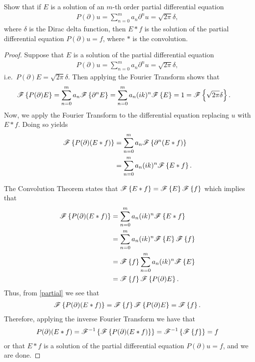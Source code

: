\begin{problem}{9}
  Show that if $E$ is a solution of an $m$-th order partial differential equation
  \begin{align*}
    P(\partial)u = \sum_{n=0}^m a_n \partial^n u = \sqrt{2\pi} \delta,
  \end{align*}
  where $\delta$ is the Dirac delta function, then $E \ast f$ is the solution of
  the partial differential equation $P(\partial)u = f$, where $\ast$ is the convolution.
\end{problem}

\begin{proof}
  Suppose that $E$ is a solution of the partial differential equation
  \begin{align*}
    P(\partial)u = \sum_{n=0}^m a_n \partial^n u = \sqrt{2\pi} \delta,
  \end{align*}
  i.e.\ $P(\partial)E = \sqrt{2\pi}\delta$. Then applying the Fourier Transform
  shows that
  \begin{align}\label{partial}
    \mathscr{F}\left\{ {P(\partial)E} \right\} &= \sum_{n=0}^m a_n \mathscr{F}\left\{ {\partial^n E} \right\}
    = \sum_{n=0}^m a_n (ik)^n \mathscr{F}\left\{ {E} \right\} = 1 = \mathscr{F}\left\{ {\sqrt{2\pi} \delta} \right\}.
  \end{align}
  Now, we apply the Fourier Transform to the differential
  equation replacing $u$ with $E \ast f$. Doing so yields
  \begin{align*}
    \mathscr{F}\left\{ {P(\partial)(E\ast f)} \right\} &= \sum_{n=0}^m a_n \mathscr{F}\left\{ {\partial^n (E\ast f)} \right\} \\
    &=  \sum_{n=0}^m a_n (ik)^n\mathscr{F}\left\{ {E\ast f} \right\}.
  \end{align*}

  The Convolution Theorem states that $\mathscr{F}\left\{ {E \ast f} \right\} = \mathscr{F}\left\{ {E} \right\}\mathscr{F}\left\{ {f} \right\}$ which implies that
  \begin{align*}
    \mathscr{F}\left\{ {P(\partial)(E\ast f)} \right\}
    &=  \sum_{n=0}^m a_n (ik)^n\mathscr{F}\left\{ {E\ast f} \right\} \\
    &=  \sum_{n=0}^m a_n (ik)^n\mathscr{F}\left\{ {E} \right\}\mathscr{F}\left\{ {f} \right\} \\
    &=  \mathscr{F}\left\{ {f} \right\}\sum_{n=0}^m a_n (ik)^n\mathscr{F}\left\{ {E} \right\} \\
    &= \mathscr{F}\left\{ {f} \right\}\mathscr{F}\left\{ {P(\partial)E} \right\}.
  \end{align*}
  Thus, from \eqref{partial} we see that
  \begin{align*}
    \mathscr{F}\left\{ {P(\partial)(E\ast f)} \right\} =  \mathscr{F}\left\{ {f} \right\}\mathscr{F}\left\{ {P(\partial)E} \right\} = \mathscr{F}\left\{ {f} \right\}.
  \end{align*}
  Therefore, applying the inverse Fourier Transform we have that
  \begin{align*}
    P(\partial)(E\ast f) = \mathscr{F}^{-1}\left\{ {\mathscr{F}\left\{ {P(\partial)(E\ast f)} \right\}} \right\} = \mathscr{F}^{-1}\left\{ {\mathscr{F}\left\{ {f} \right\}} \right\} = f
  \end{align*}
  or that $E\ast f$ is a solution of the partial differential equation $P(\partial)u =f$, and we are done.

\end{proof}
\newpage

